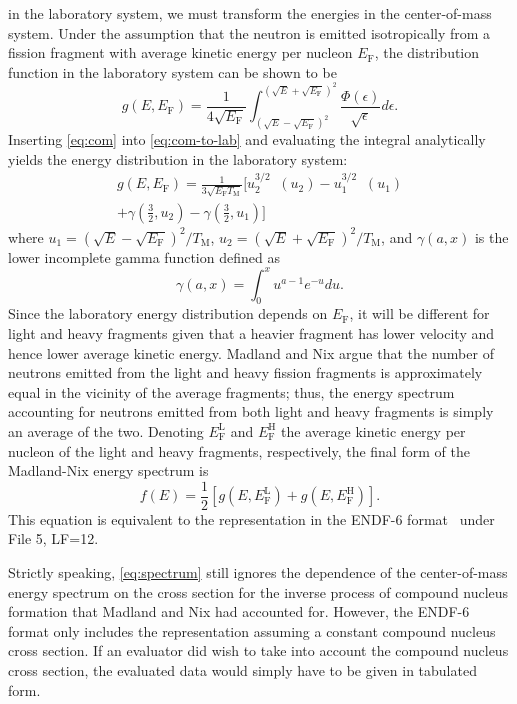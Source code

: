 \documentclass[5p]{elsarticle}
\DeclareMathOperator\expint{E_1}
\newcommand{\tmax}{T_{\mathrm{M}}}
\newcommand{\ef}{E_{\mathrm{F}}}
\newcommand{\efl}{E_{\mathrm{F}}^{\mathrm{L}}}
\newcommand{\efh}{E_{\mathrm{F}}^{\mathrm{H}}}
\begin{document}
in the laboratory system, we must transform the energies in the center-of-mass
system. Under the assumption that the neutron is emitted isotropically from a
fission fragment with average kinetic energy per nucleon $\ef$, the distribution
function in the laboratory system can be shown to be~\cite{physrev-terrell-1959}
\begin{equation}
  g(E,\ef) = \frac{1}{4\sqrt{\ef}} \int_{\left( \sqrt{E} - \sqrt{\ef}
    \right)^2}^{\left( \sqrt{E} + \sqrt{\ef} \right)^2}
  \frac{\Phi(\epsilon)}{\sqrt{\epsilon}} d\epsilon.
  \label{eq:com-to-lab}
\end{equation}
Inserting \autoref{eq:com} into \autoref{eq:com-to-lab} and evaluating the integral
analytically yields the energy distribution in the laboratory system:
\begin{multline}
  g(E,\ef) = \frac{1}{3\sqrt{\ef \tmax}} \bigg [ u_2^{3/2} \expint (u_2) -
    u_1^{3/2} \expint (u_1) \\ + \gamma \left( \frac{3}{2}, u_2 \right ) -
    \gamma \left( \frac{3}{2}, u_1 \right) \bigg ]
\end{multline}
where $u_1 = \left ( \sqrt{E} - \sqrt{\ef} \right )^2/\tmax$, $u_2 = \left (
\sqrt{E} + \sqrt{\ef} \right)^2/\tmax$, and $\gamma(a,x)$ is the lower incomplete
gamma function defined as
\begin{equation*}
  \gamma(a,x) = \int_0^x u^{a-1} e^{-u} du.
\end{equation*}
Since the laboratory energy distribution depends on $\ef$, it will be different
for light and heavy fragments given that a heavier fragment has lower velocity
and hence lower average kinetic energy. Madland and Nix argue that the number of
neutrons emitted from the light and heavy fission fragments is approximately
equal in the vicinity of the average fragments; thus, the energy spectrum
accounting for neutrons emitted from both light and heavy fragments is simply an
average of the two. Denoting $\efl$ and $\efh$ the average kinetic energy per
nucleon of the light and heavy fragments, respectively, the final form of the
Madland-Nix energy spectrum is
\begin{equation}
  \label{eq:spectrum}
  f(E) = \frac{1}{2} \left [ g(E, \efl) + g(E, \efh) \right ].
\end{equation}
This equation is equivalent to the representation in the ENDF-6
format~\cite{bnl-trkov-2012} under File 5, LF=12.

Strictly speaking, \autoref{eq:spectrum} still ignores the dependence of the
center-of-mass energy spectrum on the cross section for the inverse process of
compound nucleus formation that Madland and Nix had accounted for. However, the
ENDF-6 format only includes the representation assuming a constant compound
nucleus cross section. If an evaluator did wish to take into account the
compound nucleus cross section, the evaluated data would simply have to be given
in tabulated form.
\end{document}

